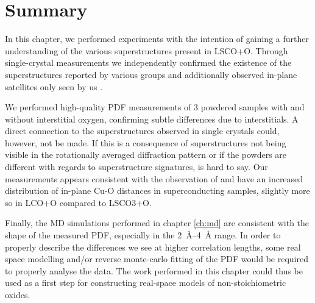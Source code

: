 \section{Summary}
In this chapter, we performed experiments with the intention of gaining a further understanding of the various superstructures present in LSCO+O. Through single-crystal measurements we independently confirmed the existence of the superstructures reported by various groups \cite{Kusmartsev2000} and additionally observed in-plane satellites only seen by us \cite{Ray2016}.

We performed high-quality PDF measurements of 3 powdered samples with and without interstitial oxygen, confirming subtle differences due to interstitials. A direct connection to the superstructures observed in single crystals could, however, not be made. If this is a consequence of superstructures not being visible in the rotationally averaged diffraction pattern or if the powders are different with regards to superstructure signatures, is hard to say. Our measurements appears consistent with the observation of \citeauthor{Bozin2000} \cite{Bozin2000} and have an increased distribution of in-plane Cu-O distances in superconducting samples, slightly more so in LCO+O compared to LSCO3+O.

Finally, the MD simulations performed in chapter \ref{ch:md} are consistent with the shape of the measured PDF, especially in the \SIrange{2}{4}{\angstrom} range. In order to properly describe the differences we see at higher correlation lengths, some real space modelling and/or reverse monte-carlo fitting of the PDF would be required to properly analyse the data. The work performed in this chapter could thus be used as a first step for constructing real-space models of non-stoichiometric oxides.

